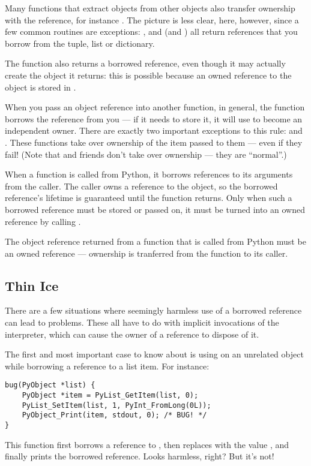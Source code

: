 \documentclass[twoside,openright]{report}
\begin{document}
Many functions that extract objects from other objects also transfer
ownership with the reference, for instance
.  The picture is less clear, here,
however, since a few common routines are exceptions:
,  and
 (and ) all return
references that you borrow from the tuple, list or dictionary.

The function  also returns a borrowed
reference, even though it may actually create the object it returns:
this is possible because an owned reference to the object is stored in
.

When you pass an object reference into another function, in general,
the function borrows the reference from you --- if it needs to store
it, it will use  to become an independent owner.
There are exactly two important exceptions to this rule:
 and .  These functions
take over ownership of the item passed to them --- even if they fail!
(Note that  and friends don't take over
ownership --- they are ``normal''.)

When a \C{} function is called from Python, it borrows references to its
arguments from the caller.  The caller owns a reference to the object,
so the borrowed reference's lifetime is guaranteed until the function
returns.  Only when such a borrowed reference must be stored or passed
on, it must be turned into an owned reference by calling
.

The object reference returned from a \C{} function that is called from
Python must be an owned reference --- ownership is tranferred from the
function to its caller.

\subsection{Thin Ice}

There are a few situations where seemingly harmless use of a borrowed
reference can lead to problems.  These all have to do with implicit
invocations of the interpreter, which can cause the owner of a
reference to dispose of it.

The first and most important case to know about is using
 on an unrelated object while borrowing a reference
to a list item.  For instance:

\bcode\begin{verbatim}
bug(PyObject *list) {
    PyObject *item = PyList_GetItem(list, 0);
    PyList_SetItem(list, 1, PyInt_FromLong(0L));
    PyObject_Print(item, stdout, 0); /* BUG! */
}
\end{verbatim}\ecode
%
This function first borrows a reference to , then
replaces  with the value , and finally prints
the borrowed reference.  Looks harmless, right?  But it's not!
\end{document}
